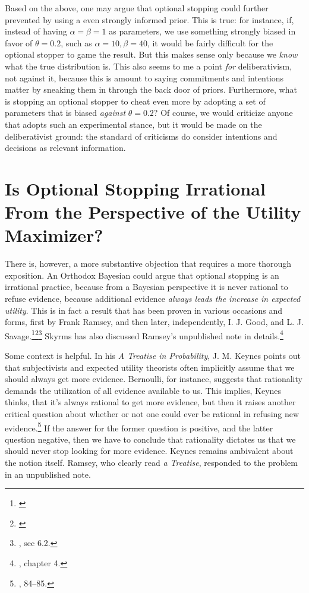 Based on the above, one may argue that optional stopping could further prevented by using a even strongly informed prior. This is true: for instance, if, instead of
having \(\alpha = \beta = 1\) as parameters, we use something strongly
biased in favor of \(\theta = 0.2\), such as
\(\alpha = 10, \beta = 40\), it would be fairly difficult for the
optional stopper to game the result. But this makes sense only because we \emph{know} what the true distribution is. This also seems to me a point
\emph{for} deliberativism, not against it, because this is amount to
saying commitments and intentions matter by sneaking them in through the
back door of priors. Furthermore, what is stopping an optional stopper
to cheat even more by adopting a set of parameters that is biased
\emph{against} \(\theta = 0.2\)? Of course, we would criticize anyone
that adopts such an experimental stance, but it would be made on the
deliberativist ground: the standard of criticisms do consider intentions and decisions as relevant information.

\hypertarget{is-optional-stopping-irrational-from-the-perspective-of-the-utility-maximizer}{%
\section{Is Optional Stopping Irrational From the Perspective of the
Utility
Maximizer?}\label{is-optional-stopping-irrational-from-the-perspective-of-the-utility-maximizer}}

There is, however, a more substantive objection that requires a more
thorough exposition. An Orthodox Bayesian could argue that optional
stopping is an irrational practice, because from a Bayesian perspective
it is never rational to refuse evidence, because additional evidence
\emph{always leads the increase in expected utility}. This is in fact a
result that has been proven in various occasions and forms, first by Frank
Ramsey, and then later, independently, I. J. Good, and L. J. Savage.\footnote{\cite{ramseyvalue}}\footnote{\cite{goodtotalevidence}}\footnote{\cite{savage}, sec 6.2.} Skyrms has also discussed Ramsey's unpublished note in details.\footnote{\cite{rationaldel}, chapter 4.}

Some context is helpful. In his \emph{A Treatise in Probability}, J. M.
Keynes points out that subjectivists and expected utility theorists
often implicitly assume that we should always get more evidence.
Bernoulli, for instance, suggests that rationality demands the
utilization of all evidence available to us. This implies, Keynes
thinks, that it's always rational to get more evidence, but then it
raises another critical question about whether or not one could ever be
rational in refusing new evidence.\footnote{\cite{keynes}, 84--85.} If the answer for the former question is
positive, and the latter question negative, then we have to conclude
that rationality dictates us that we should never stop looking for more
evidence. Keynes remains ambivalent about the notion itself. Ramsey, who clearly read \emph{a Treatise}, responded to the problem in an
unpublished note.

